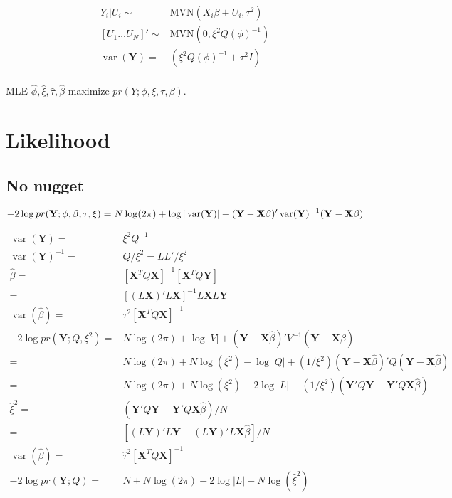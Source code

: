 \documentclass[12pt]{article}
\DeclareMathOperator{\var}{var}
\begin{document}
\begin{align*}
Y_i| U_i \sim & \text{MVN}(X_i\beta + U_i, \tau^2 )\\
[U_1 \ldots U_N]' \sim  & \text{MVN}(0, \xi^2 Q(\phi)^{-1})\\
\var(\mathbf{Y})  = &  ( \xi^2 Q(\phi)^{-1} + \tau^2 I  )  \\
\end{align*}

MLE  $\hat\phi, \hat\xi, \hat\tau,\hat\beta$  maximize $pr(Y ;
\phi,\xi,\tau,\beta)$.

\section*{Likelihood}
\subsection{No nugget}
\[
-2 \log pr(\mathbf{Y};\phi,\beta,\tau,\xi) = N \log(2\pi) + 
\log| \var(\mathbf{Y})  | + \\
( \mathbf{Y} -\mathbf{X}\beta)  '
  \var(\mathbf{Y})^{-1}
(\mathbf{Y} - \mathbf{X}\beta)
\]

\begin{align*}
\var(\mathbf{Y}) = &\xi^2 Q^{-1} \\
\var(\mathbf{Y})^{-1} = &Q/\xi^2 = L L'/\xi^2\\
\hat\beta = &[\mathbf{X}^T
  Q \mathbf{X}]^{-1}
  [\mathbf{X}^T
  Q \mathbf{Y}]\\
   = & [(L\mathbf{X})'L\mathbf{X}]^{-1}L\mathbf{X}L\mathbf{Y}\\
\var(\hat\beta) = & \tau^2 [\mathbf{X}^T  Q \mathbf{X}]^{-1}\\
-2 \log pr(\mathbf{Y};Q, \xi^2) = &
N \log(2\pi) +
\log| V| + 
( \mathbf{Y} -\mathbf{X}\hat\beta)  '
  V^{-1}
(\mathbf{Y} - \mathbf{X}\hat\beta)\\
= & N \log(2\pi) + N \log(\xi^2) - \log|Q| + (1/\xi^2)( \mathbf{Y} -\mathbf{X}\hat\beta)  '
  Q
(\mathbf{Y} - \mathbf{X}\hat\beta)\\
= & N \log(2\pi) + N \log(\xi^2) - 2\log|L| +
(1/\xi^2)( \mathbf{Y}'
  Q \mathbf{Y} - \mathbf{Y}'
  Q \mathbf{X}\hat\beta)\\
\hat\xi^2 = & ( \mathbf{Y}'
  Q \mathbf{Y} - \mathbf{Y}'
  Q \mathbf{X}\hat\beta)/N\\
  = & [(L\mathbf{Y})'L\mathbf{Y} - (L\mathbf{Y})'L\mathbf{X}\hat\beta]/N\\
 \var(\hat\beta) = & \hat\tau^2 [\mathbf{X}^T  Q \mathbf{X}]^{-1}\\ 
 -2 \log pr(\mathbf{Y};Q)=&  N + N \log(2\pi)  - 2\log|L|+N \log(\hat\xi^2)
\end{align*}
\end{document}
